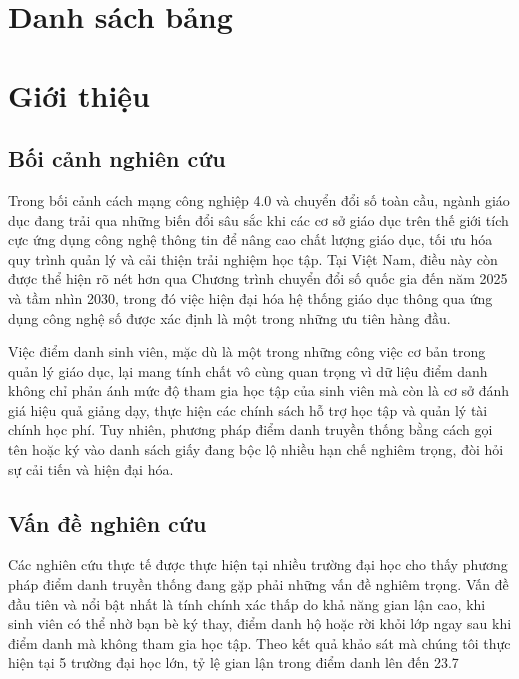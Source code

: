 \documentclass[12pt,a4paper]{report}
\begin{document}
\chapter*{Danh sách bảng}
\listoftables

\tableofcontents

\chapter{Giới thiệu}
\section{Bối cảnh nghiên cứu}
Trong bối cảnh cách mạng công nghiệp 4.0 và chuyển đổi số toàn cầu, ngành giáo dục đang trải qua những biến đổi sâu sắc khi các cơ sở giáo dục trên thế giới tích cực ứng dụng công nghệ thông tin để nâng cao chất lượng giáo dục, tối ưu hóa quy trình quản lý và cải thiện trải nghiệm học tập. Tại Việt Nam, điều này còn được thể hiện rõ nét hơn qua Chương trình chuyển đổi số quốc gia đến năm 2025 và tầm nhìn 2030, trong đó việc hiện đại hóa hệ thống giáo dục thông qua ứng dụng công nghệ số được xác định là một trong những ưu tiên hàng đầu.

Việc điểm danh sinh viên, mặc dù là một trong những công việc cơ bản trong quản lý giáo dục, lại mang tính chất vô cùng quan trọng vì dữ liệu điểm danh không chỉ phản ánh mức độ tham gia học tập của sinh viên mà còn là cơ sở đánh giá hiệu quả giảng dạy, thực hiện các chính sách hỗ trợ học tập và quản lý tài chính học phí. Tuy nhiên, phương pháp điểm danh truyền thống bằng cách gọi tên hoặc ký vào danh sách giấy đang bộc lộ nhiều hạn chế nghiêm trọng, đòi hỏi sự cải tiến và hiện đại hóa.

\section{Vấn đề nghiên cứu}
Các nghiên cứu thực tế được thực hiện tại nhiều trường đại học cho thấy phương pháp điểm danh truyền thống đang gặp phải những vấn đề nghiêm trọng. Vấn đề đầu tiên và nổi bật nhất là tính chính xác thấp do khả năng gian lận cao, khi sinh viên có thể nhờ bạn bè ký thay, điểm danh hộ hoặc rời khỏi lớp ngay sau khi điểm danh mà không tham gia học tập. Theo kết quả khảo sát mà chúng tôi thực hiện tại 5 trường đại học lớn, tỷ lệ gian lận trong điểm danh lên đến 23.7%
\end{document}

